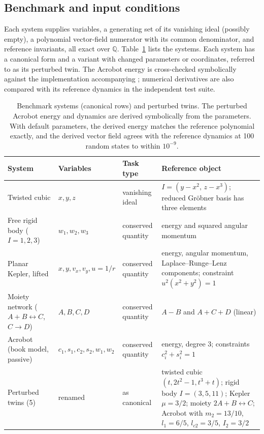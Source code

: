 \documentclass[10pt]{article}
\newcommand{\Q}{\mathbb{Q}}
\begin{document}
\subsection{Benchmark and input conditions}\label{sec:benchmark}

Each system supplies variables, a generating set of its vanishing ideal (possibly empty), a polynomial vector-field numerator with its common denominator, and reference invariants, all exact over $\Q$. Table~\ref{tab:systems} lists the systems. Each system has a canonical form and a variant with changed parameters or coordinates, referred to as its perturbed twin. The Acrobot energy is cross-checked symbolically against the implementation accompanying \citet{gebrekidan2026diagnosing}; numerical derivatives are also compared with its reference dynamics in the independent test suite.

\begin{table}[!htbp]
\centering
\small
\renewcommand{\arraystretch}{1.15}
\begin{tabularx}{\textwidth}{@{}>{\raggedright\arraybackslash}p{2.5cm}
                               >{\raggedright\arraybackslash}p{2.9cm}
                               >{\raggedright\arraybackslash}p{1.7cm}
                               >{\raggedright\arraybackslash}X@{}}
\toprule
System & Variables & Task type & Reference object \\
\midrule
Twisted cubic & $x,y,z$ & vanishing ideal & $I=(y-x^{2},\,z-x^{3})$; reduced Gr\"obner basis has three elements \\
Free rigid body ($I=1,2,3$) & $w_{1},w_{2},w_{3}$ & conserved quantity & energy and squared angular momentum \\
Planar Kepler, lifted & $x,y,v_{x},v_{y},u=1/r$ & conserved quantity & energy, angular momentum, Laplace--Runge--Lenz components; constraint $u^{2}(x^{2}+y^{2})=1$ \\
Moiety network ($A+B\leftrightarrow C$, $C\to D$) & $A,B,C,D$ & conserved quantity & $A-B$ and $A+C+D$ (linear) \\
Acrobot (book model, passive) & $c_{1},s_{1},c_{2},s_{2},w_{1},w_{2}$ & conserved quantity & energy, degree 3; constraints $c_{i}^{2}+s_{i}^{2}=1$ \\
\midrule
Perturbed twins (5) & renamed & as canonical & twisted cubic $(t,2t^{2}-1,t^{3}+t)$; rigid body $I=(3,5,11)$; Kepler $\mu=3/2$; moiety $2A+B\leftrightarrow C$; Acrobot with $m_{2}=13/10$, $l_{1}=6/5$, $l_{c2}=3/5$, $I_{2}=3/2$ \\
\bottomrule
\end{tabularx}
\caption{Benchmark systems (canonical rows) and perturbed twins. The perturbed Acrobot energy and dynamics are derived symbolically from the parameters. With default parameters, the derived energy matches the reference polynomial exactly, and the derived vector field agrees with the reference dynamics at 100 random states to within $10^{-9}$.}
\label{tab:systems}
\end{table}
\end{document}
